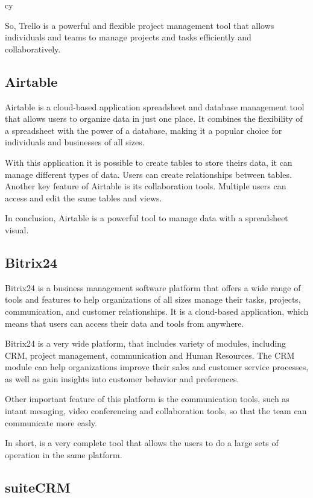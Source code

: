cy\documentclass{article}
\begin{document}
So, Trello is a powerful and flexible project management tool that allows individuals and teams to manage projects and tasks efficiently and collaboratively.

\subsection{Airtable}

Airtable is a cloud-based application spreadsheet and database management tool that allows users to organize data in just one place. It combines the flexibility of a spreadsheet with the power of a database, making it a popular choice for individuals and businesses of all sizes.

With this application it is possible to create tables to store theirs data, it can manage different types of data. Users can create relationships between tables. Another key feature of Airtable is its collaboration tools. Multiple users can access and edit the same tables and views.


In conclusion, Airtable is a powerful tool to manage data with a spreadsheet visual.

\subsection{Bitrix24}

Bitrix24 is a business management software platform that offers a wide range of tools and features to help organizations of all sizes manage their tasks, projects, communication, and customer relationships. It is a cloud-based application, which means that users can access their data and tools from anywhere.

Bitrix24 is a very wide platform, that includes variety of modules, including CRM, project management, communication and Human Resources. The CRM module can help organizations improve their sales and customer service processes, as well as gain insights into customer behavior and preferences.

Other important feature of this platform is the communication tools, such as intant mesaging, video conferencing and collaboration tools, so that the team can communicate more easly.

In short, is a very complete tool that allows the users to do a large sets of operation in the same platform.



\subsection{suiteCRM}
\end{document}
